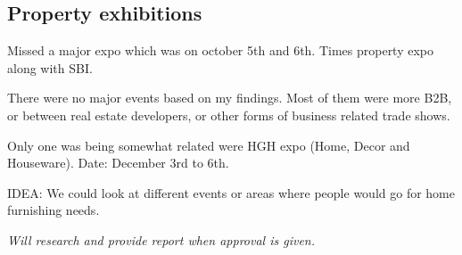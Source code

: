 \documentclass[12pt, a4paper]{article}
\begin{document}
\subsection{Property exhibitions}

Missed a major expo which was on october 5th and 6th. Times property expo along with SBI.

\noindent There were no major events based on my findings. Most of them were more B2B, or between real estate developers, or other forms of business related trade shows.

\noindent Only one was being somewhat related were HGH expo (Home, Decor and Houseware). Date: December 3rd to 6th.

\vspace{0.5cm}

\noindent IDEA: We could look at different events or areas where people would go for home furnishing needs.

\vspace{0.25cm}


\textit{Will research and provide report when approval is given.}
\end{document}

